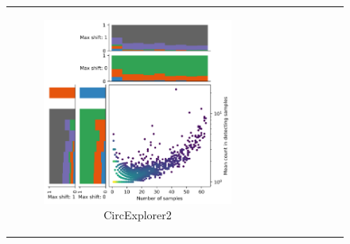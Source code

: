 \begin{figure}[ht] \begin{tabular}{cc} \begin{subfigure}{.4\textwidth}
                                           \centering 

                                           \includegraphics[width=\linewidth]{chapters/4_results_and_discussion/figures/detection/density/circexplorer2.png}
                                           \caption{CircExplorer2} 

                                           \label{fig:detection_density_circexplorer2} \end{subfigure} &
               \begin{subfigure}{.4\textwidth} \centering 


\end{subfigure}
\end{tabular}
\end{figure}
